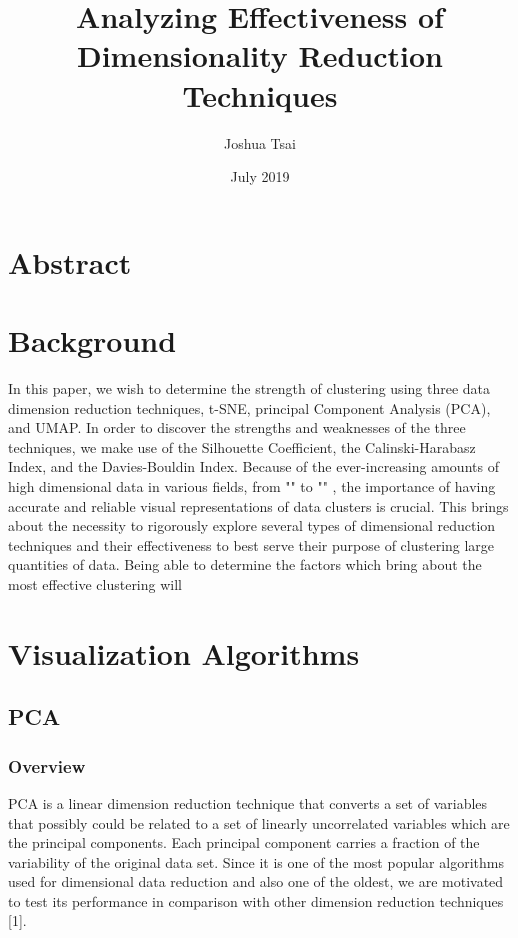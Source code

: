 \documentclass[11pt]{article}
\title{Analyzing Effectiveness of Dimensionality Reduction Techniques}
\author{Joshua Tsai}
\date{July 2019}
\theoremstyle{definition}
\begin{document}
\maketitle
\section{Abstract}

\section{Background}
In this paper, we wish to determine the strength of clustering using three data dimension reduction techniques, t-SNE, principal Component Analysis (PCA), and UMAP. In order to discover the strengths and weaknesses of the three techniques, we make use of the Silhouette Coefficient, the Calinski-Harabasz Index, and the Davies-Bouldin Index. Because of the ever-increasing amounts of high dimensional data in various fields, from  "" to "" , the importance of having accurate and reliable visual representations of data clusters is crucial. This brings about the necessity to rigorously explore several types of dimensional reduction techniques and their effectiveness to best serve their purpose of clustering large quantities of data. Being able to determine the factors which bring about the most effective clustering will 

\section{Visualization Algorithms}

\subsection{PCA}
\subsubsection{Overview}
PCA is a linear dimension reduction technique that converts a set of variables that possibly could be related to a set of linearly uncorrelated variables which are the principal components. Each principal component carries a fraction of the variability of the original data set. Since it is one of the most popular algorithms used for dimensional data reduction and also one of the oldest, we are motivated to test its performance in comparison with other dimension reduction techniques [1].
\\
\end{document}

